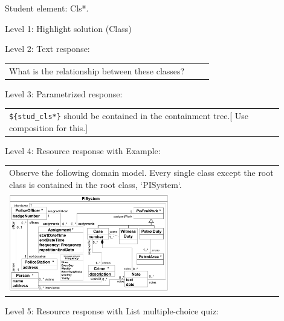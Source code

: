 Student element: Cls*.  \medskip

\noindent Level 1: Highlight solution (Class) \medskip

\noindent Level 2: Text response: \medskip

\begin{tabular}{|p{0.9\linewidth}}
What is the relationship between these classes?
\end{tabular} \medskip

\noindent Level 3: Parametrized response: \medskip

\begin{tabular}{|p{0.9\linewidth}}
\verb|${stud_cls*}| should be contained in the containment tree.[ Use composition for this.]
\end{tabular} \medskip

\noindent Level 4: Resource response with Example: \medskip

\begin{tabular}{|p{0.9\linewidth}}
Observe the following domain model. Every single class except the root class is contained in the 
root class, `PISystem`.

\\
\includegraphics[width=0.6\textwidth]{images/PISystem.png}
\end{tabular} \medskip

\noindent Level 5: Resource response with List multiple-choice quiz: \medskip

